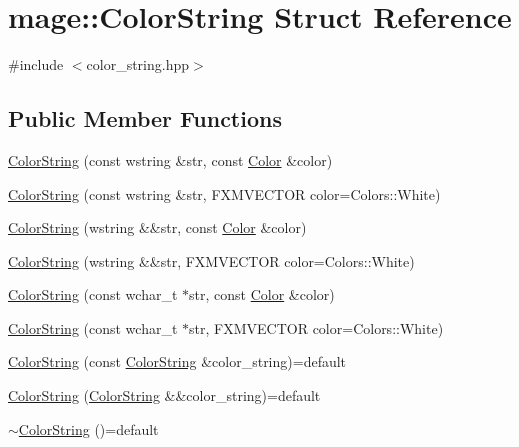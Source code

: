 \hypertarget{structmage_1_1_color_string}{}\section{mage\+:\+:Color\+String Struct Reference}
\label{structmage_1_1_color_string}


{\ttfamily \#include $<$color\+\_\+string.\+hpp$>$}

\subsection*{Public Member Functions}
\begin{DoxyCompactItemize}
\item 
\hyperlink{structmage_1_1_color_string_a9737fbe265c4432971e715439827f25a}{Color\+String} (const wstring \&str, const \hyperlink{structmage_1_1_color}{Color} \&color)
\item 
\hyperlink{structmage_1_1_color_string_a115be37cf649b0e250ca22604df34900}{Color\+String} (const wstring \&str, F\+X\+M\+V\+E\+C\+T\+OR color=Colors\+::\+White)
\item 
\hyperlink{structmage_1_1_color_string_a42597e6be67ed803a79eff88de769656}{Color\+String} (wstring \&\&str, const \hyperlink{structmage_1_1_color}{Color} \&color)
\item 
\hyperlink{structmage_1_1_color_string_a6a869d9a0325dbe261b8afc60976a7b4}{Color\+String} (wstring \&\&str, F\+X\+M\+V\+E\+C\+T\+OR color=Colors\+::\+White)
\item 
\hyperlink{structmage_1_1_color_string_aef572c89d1ed663837c6e5b1b6816984}{Color\+String} (const wchar\+\_\+t $\ast$str, const \hyperlink{structmage_1_1_color}{Color} \&color)
\item 
\hyperlink{structmage_1_1_color_string_ae60cd006f5c8fe178b097c158557b777}{Color\+String} (const wchar\+\_\+t $\ast$str, F\+X\+M\+V\+E\+C\+T\+OR color=Colors\+::\+White)
\item 
\hyperlink{structmage_1_1_color_string_aa878fda012b4149f673e905f6a8ea8b0}{Color\+String} (const \hyperlink{structmage_1_1_color_string}{Color\+String} \&color\+\_\+string)=default
\item 
\hyperlink{structmage_1_1_color_string_a68d8411da4dd7122975223e25bbcbb9a}{Color\+String} (\hyperlink{structmage_1_1_color_string}{Color\+String} \&\&color\+\_\+string)=default
\item 
\hyperlink{structmage_1_1_color_string_a95886010269c8c4bc3a27fbfe829f4c2}{$\sim$\+Color\+String} ()=default

\end{DoxyCompactItemize}
